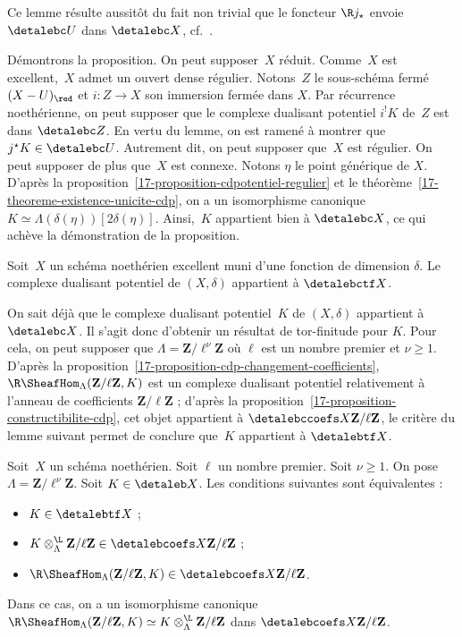 \documentclass[10pt]{../fichiers-configuration-latex/smfart}
\begin{document}
Ce lemme résulte aussitôt du fait non trivial que le foncteur
$\R j_\star $
envoie $\detalebc U$ dans $\detalebc X$, cf.~.

\bigskip

Démontrons la proposition. On peut supposer $X$ réduit. Comme $X$ est
excellent, $X$ admet un ouvert dense régulier. Notons $Z$ le sous-schéma
fermé $(X-U)_{\red}$ et $i\colon Z\to X$ son immersion fermée dans $X$.
Par récurrence noethérienne,
on peut supposer que le complexe dualisant potentiel $i^!K$ de $Z$ est dans
$\detalebc Z$. En vertu du lemme, on est ramené à montrer que $j^\star
K\in\detalebc U$. Autrement dit, on peut supposer que $X$ est régulier. On peut
supposer de plus que $X$ est connexe. Notons $\eta$ le point générique de
$X$. D'après la proposition~\ref{17-proposition-cdpotentiel-regulier} et le
théorème~\ref{17-theoreme-existence-unicite-cdp}, on a un
isomorphisme canonique $K\simeq\Lambda(\delta(\eta))[2\delta(\eta)]$.
Ainsi, $K$ appartient bien à $\detalebc X$, ce qui achève la démonstration de
la proposition.

\begin{proposition3}
Soit $X$ un schéma noethérien excellent muni d'une fonction de dimension
$\delta$. Le complexe dualisant potentiel de $(X,\delta)$ appartient à
$\detalebctf X$.
\end{proposition3}

On sait déjà que le complexe dualisant potentiel $K$ de $(X,\delta)$
appartient à $\detalebc
X$. Il s'agit donc d'obtenir un résultat de tor-finitude pour $K$. Pour
cela, on peut supposer que $\Lambda=\mathbf{Z}/\ell^\nu\mathbf{Z}$ où
$\ell$ est un nombre premier et $\nu\geq 1$. D'après la
proposition~\ref{17-proposition-cdp-changement-coefficients},
$\R\SheafHom_\Lambda(\mathbf{Z}/\ell\mathbf{Z},K)$ est un complexe
dualisant potentiel relativement à l'anneau de coefficients
$\mathbf{Z}/\ell\mathbf{Z}$ ; d'après la 
proposition~\ref{17-proposition-constructibilite-cdp},
cet objet appartient à $\detalebccoefs X {\mathbf{Z}/\ell\mathbf{Z}}$, le
critère du lemme suivant permet de conclure que $K$ appartient à
$\detalebtf X$.

\begin{lemme3}\label{17-lemme-tor-finitude-z-l-n}
Soit $X$ un schéma noethérien. Soit $\ell$ un nombre premier. Soit $\nu\geq
1$. On pose $\Lambda={\mathbf{Z}/\ell^\nu\mathbf{Z}}$.
Soit $K\in\detaleb X$. Les conditions
suivantes sont équivalentes :
\begin{itemize}
\item[(i)] $K\in\detalebtf X$ ;
\item[(ii)] $K\otimes^{\L}_{\Lambda} \mathbf{Z}/\ell\mathbf{Z}\in
\detalebcoefs X {\mathbf{Z}/\ell\mathbf{Z}}$ ;
\item[(iii)]
$\R\SheafHom_\Lambda(\mathbf{Z}/\ell\mathbf{Z},K)\in\detalebcoefs X
{\mathbf{Z}/\ell\mathbf{Z}}$.
\end{itemize}
Dans ce cas, on a un isomorphisme canonique
$\R\SheafHom_\Lambda(\mathbf{Z}/\ell\mathbf{Z},K)\simeq
K\otimes_{\Lambda}^{\L}\mathbf{Z}/\ell\mathbf{Z}$ dans $\detalebcoefs X
{\mathbf{Z}/\ell\mathbf{Z}}$.
\end{lemme3}
\end{document}
